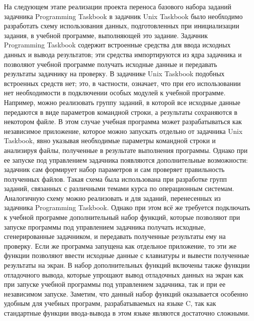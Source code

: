 На следующем этапе реализации проекта переноса базового набора заданий задачника Programming Taskbook в задачник Unix Taskbook было необходимо разработать схему использования данных, подготовленных при инициализации задания, в учебной программе, выполняющей это задание. Задачник Programming Taskbook содержит встроенные средства для ввода исходных данных и вывода результатов; эти средства импортируются из ядра задачника и позволяют учебной программе получать исходные данные и передавать результаты задачнику на проверку. 
В задачнике Unix Taskbook подобных встроенных средств нет; это, в частности, означает, что при его использовании нет необходимости в подключении особых модулей к учебной программе. Например, можно реализовать группу заданий, в которой все исходные данные передаются в виде параметров командной строки, а результаты сохраняются в некотором файле. В этом случае учебная программа может разрабатываться как независимое приложение, которое можно запускать отдельно от задачника Unix Taskbook, явно указывая необходимые параметры командной строки и анализируя файлы, полученные в результате выполнения программы. Однако при ее запуске под управлением задачника появляются дополнительные возможности: задачник сам формирует набор параметров и сам проверяет правильность полученных файлов. Такая схема была использована при разработке групп заданий, связанных с различными темами курса по операционным системам.
Аналогичную схему можно реализовать и для заданий, перенесенных из задачника Programming Taskbook. Однако при этом всё же требуется подключать к учебной программе дополнительный набор функций, которые позволяют при запуске программы под управлением задачника получать исходные, сгенерированные задачником, и передавать полученные результаты ему на проверку. Если же программа запущена как отдельное приложение, то эти же функции позволяют ввести исходные данные с клавиатуры и вывести полученные результаты на экран. В набор дополнительных функций включены также функции отладочного вывода, которые упрощают вывод отладочных данных на экран как при запуске учебной программы под управлением задачника, так и при ее независимом запуске. Заметим, что данный набор функций оказывается особенно удобным для учебных программ, разрабатываемых на языке C, так как стандартные функции ввода-вывода в этом языке являются достаточно сложными.

